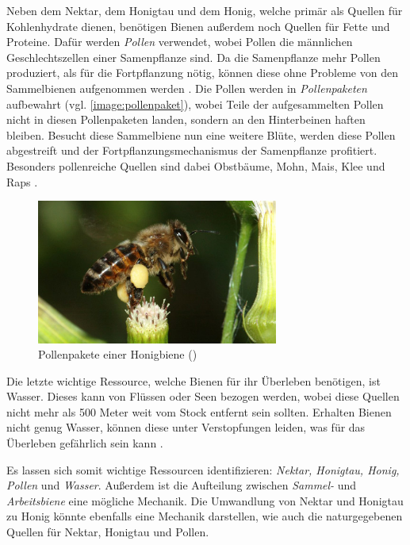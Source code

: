 Neben dem Nektar, dem Honigtau und dem Honig, welche primär als Quellen für Kohlenhydrate dienen, benötigen Bienen außerdem noch Quellen für Fette und Proteine. Dafür werden \textit{Pollen} verwendet, wobei Pollen die männlichen Geschlechtszellen einer Samenpflanze sind. Da die Samenpflanze mehr Pollen produziert, als für die Fortpflanzung nötig, können diese ohne Probleme von den Sammelbienen aufgenommen werden \cite*[]{bees:honeywinter}. Die Pollen werden in \textit{Pollenpaketen} aufbewahrt (vgl. \autoref{image:pollenpaket}), wobei Teile der aufgesammelten Pollen nicht in diesen Pollenpaketen landen, sondern an den Hinterbeinen haften bleiben. Besucht diese Sammelbiene nun eine weitere Blüte, werden diese Pollen abgestreift und der Fortpflanzungsmechanismus der Samenpflanze profitiert. Besonders pollenreiche Quellen sind dabei Obstbäume, Mohn, Mais, Klee und Raps \cite*[]{bees:honeywinter}.

\begin{figure}
    \begin{center}
        \includegraphics[width=300px]{0.bilder/pollenpaket.jpg}
    \end{center}
    \caption{Pollenpakete einer Honigbiene (\cite{bees:name})} \label{image:pollenpaket}
\end{figure}

Die letzte wichtige Ressource, welche Bienen für ihr Überleben benötigen, ist Wasser. Dieses kann von Flüssen oder Seen bezogen werden, wobei diese Quellen nicht mehr als 500 Meter weit vom Stock entfernt sein sollten. Erhalten Bienen nicht genug Wasser, können diese unter Verstopfungen leiden, was für das Überleben gefährlich sein kann \cite*[]{bees:honeywinter, bees:food}.

Es lassen sich somit wichtige Ressourcen identifizieren: \textit{Nektar, Honigtau, Honig, Pollen} und \textit{Wasser}. Außerdem ist die Aufteilung zwischen \textit{Sammel-} und \textit{Arbeitsbiene} eine mögliche Mechanik. Die Umwandlung von Nektar und Honigtau zu Honig könnte ebenfalls eine Mechanik darstellen, wie auch die naturgegebenen Quellen für Nektar, Honigtau und Pollen.